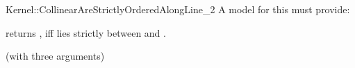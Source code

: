 \begin{ccRefFunctionObjectConcept}{Kernel::CollinearAreStrictlyOrderedAlongLine_2}
A model for this must provide:


         {returns , iff  lies strictly between 
          and . }

\ccRefines
{} (with three arguments)

\ccSeeAlso
{}  \\

\end{ccRefFunctionObjectConcept}
